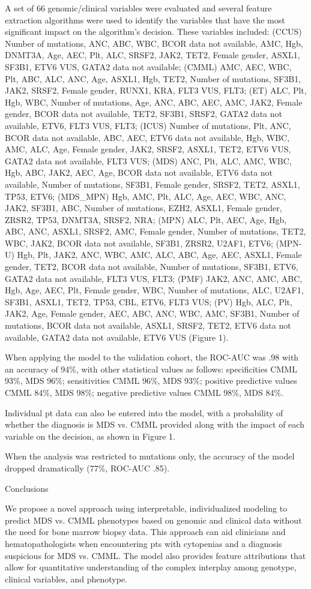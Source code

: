 A set of 66 genomic/clinical variables were evaluated and several feature extraction algorithms were used to identify the variables that have the most significant impact on the algorithm's decision. These variables included: (CCUS) Number of mutations, ANC, ABC, WBC, BCOR data not available, AMC, Hgb, DNMT3A, Age, AEC, Plt, ALC, SRSF2, JAK2, TET2, Female gender, ASXL1, SF3B1, ETV6 VUS, GATA2 data not available; (CMML) AMC, AEC, WBC, Plt, ABC, ALC, ANC, Age, ASXL1, Hgb, TET2, Number of mutations, SF3B1, JAK2, SRSF2, Female gender, RUNX1, KRA, FLT3 VUS, FLT3; (ET) ALC, Plt, Hgb, WBC, Number of mutations, Age, ANC, ABC, AEC, AMC, JAK2, Female gender, BCOR data not available, TET2, SF3B1, SRSF2, GATA2 data not available, ETV6, FLT3 VUS, FLT3; (ICUS) Number of mutations, Plt, ANC, BCOR data not available, ABC, AEC, ETV6 data not available, Hgb, WBC, AMC, ALC, Age, Female gender, JAK2, SRSF2, ASXL1, TET2, ETV6 VUS, GATA2 data not available, FLT3 VUS; (MDS) ANC, Plt, ALC, AMC, WBC, Hgb, ABC, JAK2, AEC, Age, BCOR data not available, ETV6 data not available, Number of mutations, SF3B1, Female gender, SRSF2, TET2, ASXL1, TP53, ETV6; (MDS_MPN) Hgb, AMC, Plt, ALC, Age, AEC, WBC, ANC, JAK2, SF3B1, ABC, Number of mutations, EZH2, ASXL1, Female gender, ZRSR2, TP53, DNMT3A, SRSF2, NRA; (MPN) ALC, Plt, AEC, Age, Hgb, ABC, ANC, ASXL1, SRSF2, AMC, Female gender, Number of mutations, TET2, WBC, JAK2, BCOR data not available, SF3B1, ZRSR2, U2AF1, ETV6; (MPN-U) Hgb, Plt, JAK2, ANC, WBC, AMC, ALC, ABC, Age, AEC, ASXL1, Female gender, TET2, BCOR data not available, Number of mutations, SF3B1, ETV6, GATA2 data not available, FLT3 VUS, FLT3; (PMF) JAK2, ANC, AMC, ABC, Hgb, Age, AEC, Plt, Female gender, WBC, Number of mutations, ALC, U2AF1, SF3B1, ASXL1, TET2, TP53, CBL, ETV6, FLT3 VUS; (PV) Hgb, ALC, Plt, JAK2, Age, Female gender, AEC, ABC, ANC, WBC, AMC, SF3B1, Number of mutations, BCOR data not available, ASXL1, SRSF2, TET2, ETV6 data not available, GATA2 data not available, ETV6 VUS (Figure 1).

When applying the model to the validation cohort, the ROC-AUC was .98 with an accuracy of 94\%, with other statistical values as follows: specificities CMML 93\%, MDS 96\%; sensitivities CMML 96\%, MDS 93\%; positive predictive values CMML 84\%, MDS 98\%; negative predictive values CMML 98\%, MDS 84\%.

Individual pt data can also be entered into the model, with a probability of whether the diagnosis is MDS vs. CMML provided along with the impact of each variable on the decision, as shown in Figure 1.

When the analysis was restricted to mutations only, the accuracy of the model dropped dramatically (77\%, ROC-AUC .85).


Conclusions

We propose a novel approach using interpretable, individualized modeling to predict MDS vs. CMML phenotypes based on genomic and clinical data without the need for bone marrow biopsy data. This approach can aid clinicians and hematopathologists when encountering pts with cytopenias and a diagnosis suspicious for MDS vs. CMML. The model also provides feature attributions that allow for quantitative understanding of the complex interplay among genotype, clinical variables, and phenotype.


